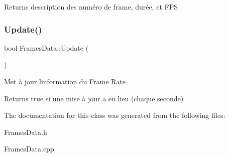 \begin{DoxyReturn}{Returns}
description des numéro de frame, durée, et F\+PS 
\end{DoxyReturn}
\mbox{\label{classFramesData_a0a13292d2ffde616533d2185de424af1}} 
\subsubsection{\texorpdfstring{Update()}{Update()}}
{\footnotesize\ttfamily bool Frames\+Data\+::\+Update (\begin{DoxyParamCaption}{ }\end{DoxyParamCaption})\hspace{0.3cm}{\ttfamily [static]}}

Met à jour l\textquotesingle{}information du Frame Rate \begin{DoxyReturn}{Returns}
true si une mise à jour a eu lieu (chaque seconde) 
\end{DoxyReturn}


The documentation for this class was generated from the following files\+:\begin{DoxyCompactItemize}
\item 
Frames\+Data.\+h\item 
Frames\+Data.\+cpp\end{DoxyCompactItemize}
